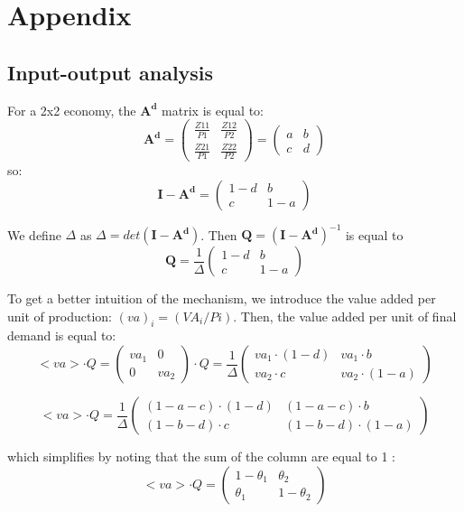 \section{Appendix}

\subsection{Input-output analysis}
\label{app:input_ouput}


For a 2x2 economy, the $\pmb{A^d}$ matrix is equal to:
$$ \pmb{A^d} = 
\begin{pmatrix} 
	\frac{Z11}{P1}  & \frac{Z12}{P2} \\
	\frac{Z21}{P1} & \frac{Z22}{P2} 
\end{pmatrix}
=
\begin{pmatrix} 
a  & b \\
c & d
\end{pmatrix}
$$
so:
$$\pmb{\pmb{I} - \pmb{A^d}} = 
\begin{pmatrix} 
1 - d  & b \\
c & 1 - a
\end{pmatrix}
$$

We define $\Delta$ as $\Delta = det(\pmb{I} - \pmb{A^d})$. Then
$\pmb{Q} = (\pmb{I} - \pmb{A^d})^{-1}$ is equal to
$$\pmb{Q} = \frac{1}{\Delta}
\begin{pmatrix} 
1 - d  & b \\
c & 1 - a
\end{pmatrix}
$$

To get a better intuition of the mechanism, we introduce the value added per unit of production: $(va)_i = (VA_i/Pi)$.
Then, the value added per unit of final demand is equal to:
$$<va> \cdot Q =
\begin{pmatrix} 
va_1 & 0 \\
0 & va_2
\end{pmatrix}
\cdot Q 
= \frac{1}{\Delta}
\begin{pmatrix} 
va_1 \cdot (1-d) & va_1 \cdot b \\
va_2 \cdot c & va_2 \cdot (1-a)
\end{pmatrix}
$$

$$<va> \cdot Q 
= \frac{1}{\Delta}
\begin{pmatrix} 
(1- a-c)\cdot (1-d) & (1-a-c) \cdot b \\
(1-b-d) \cdot c & (1-b-d) \cdot (1-a)
\end{pmatrix}
$$

which simplifies by noting that the sum of the column are equal to 1 :
$$<va> \cdot Q 
= 
\begin{pmatrix} 
1-\theta_1 & \theta_2 \\
\theta_1  & 1-\theta_2
\end{pmatrix}
$$

